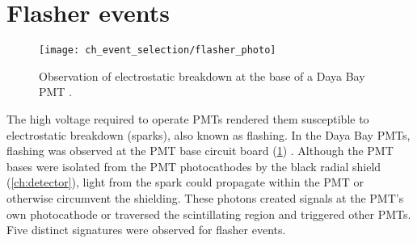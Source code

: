 \section{Flasher events}
\label{sec:flashers}

\begin{figure}
    \centering
    \texttt{[image: ch\_event\_selection/flasher\_photo]}
    \caption[Photograph of flashing PMT]{
        Observation of electrostatic breakdown at the base of a Daya Bay PMT
        \cite{flasherphotos_docdb}.
    }
    \label{fig:flasher_photo}
\end{figure}

The high voltage required to operate PMTs rendered them susceptible
to electrostatic breakdown (sparks), also known as flashing.
In the Daya Bay PMTs, flashing was observed
at the PMT base circuit board (\cref{fig:flasher_photo}) \cite{flasherphotos_docdb}.
Although the PMT bases were isolated from the
PMT photocathodes by the black radial shield (\cref{ch:detector}),
light from the spark could propagate within the PMT
or otherwise circumvent the shielding.
These photons created signals at the PMT's own photocathode
or traversed the scintillating region and triggered other PMTs.
Five distinct signatures were observed for flasher events.
